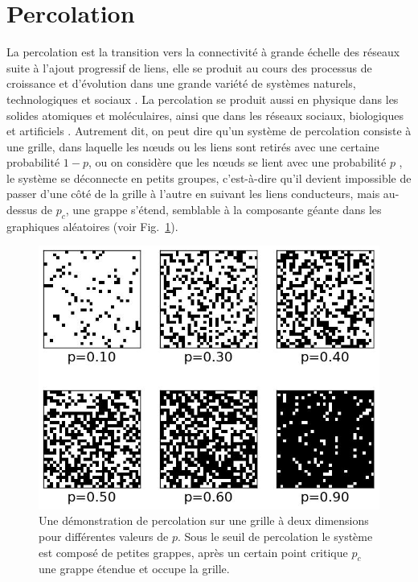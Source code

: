 \section{Percolation}
La percolation est la transition vers la connectivité à grande échelle des réseaux suite à l'ajout progressif de liens, elle se produit au cours des processus de croissance et d'évolution dans une grande variété de systèmes naturels, technologiques et sociaux \cite{Strogatz2001,Newman-al2002,Song-al2006,Parshani-al2010,Parshani2-al2010,Ben-Avraham-Havlin2001,Saberi2015}. La percolation se produit aussi en physique dans les solides atomiques et moléculaires, ainsi que dans les réseaux sociaux, biologiques et artificiels \cite{Newman-al2002,Dorogovtsev-al2008,Rozenfeld-al2010}. Autrement dit, on peut dire qu'un système de percolation consiste à une grille, dans laquelle les nœuds ou les liens sont retirés avec une certaine probabilité $1-p$, ou on considère que les nœuds se lient avec une probabilité $p$ \cite{Bunde-Havlin1996,Stauffer-Aharony1994}, le système se déconnecte en petits groupes, c'est-à-dire qu'il devient impossible de passer d'une côté de la grille à l'autre en suivant les liens conducteurs, mais au-dessus de $p_c$, une grappe s'étend, semblable à la composante géante dans les graphiques aléatoires (voir Fig.~\ref{percolation}).

\begin{figure}[h!]
	\centering
	\includegraphics[scale=0.5]{./figures/percolation}
	\caption{Une démonstration de percolation sur une grille à deux dimensions pour différentes valeurs de $p$. Sous le seuil de percolation le système est composé de petites grappes, après un certain point critique $p_c$ une grappe étendue et occupe la grille.}
	\label{percolation}
\end{figure}
